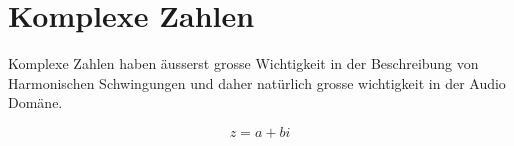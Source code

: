 \chapter{Komplexe Zahlen} \label{chap:complex}


Komplexe Zahlen haben äusserst grosse Wichtigkeit in der Beschreibung von Harmonischen Schwingungen und daher natürlich grosse wichtigkeit in der Audio Domäne.  

\begin{equation}
z = a + bi
\end{equation}
